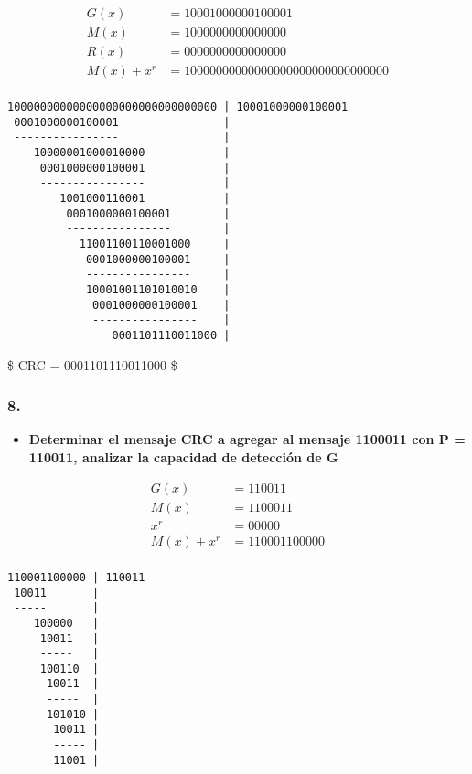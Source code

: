 \documentclass{article}
\begin{document}
\begin{align}
G(x)& =        10001000000100001 \\
M(x)& =        1000000000000000 \\
R(x)& =        0000000000000000 \\
M(x) + x^r& = 10000000000000000000000000000000 \\
\end{align}

\begin{verbatim}
10000000000000000000000000000000 | 10001000000100001
 0001000000100001                |
 ----------------                |
    10000001000010000            |
     0001000000100001            |
     ----------------            |
        1001000110001            |
         0001000000100001        |
         ----------------        |
           11001100110001000     |
            0001000000100001     |
            ----------------     |
            10001001101010010    |
             0001000000100001    |
             ----------------    |
                0001101110011000 |
\end{verbatim}

\$ CRC = 0001101110011000 \$

\subsubsection{8.}\label{section}

\begin{itemize}
\itemsep1pt\parskip0pt
\item
  \textbf{Determinar el mensaje CRC a agregar al mensaje 1100011 con P =
  110011, analizar la capacidad de detección de G}
\end{itemize}

\begin{align}
G(x)& =        110011 \\
M(x)& =        1100011 \\
x^r& =         00000\\
M(x) + x^r& = 110001100000 \\
\end{align}

\begin{verbatim}
110001100000 | 110011
 10011       |
 -----       |
    100000   |
     10011   |
     -----   |
     100110  |
      10011  |
      -----  |
      101010 |
       10011 |
       ----- |
       11001 |
      
\end{verbatim}
\end{document}
